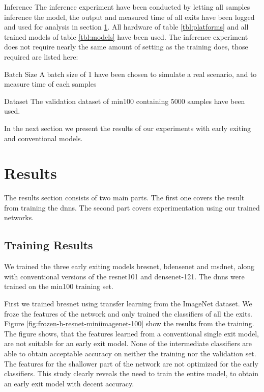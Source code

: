 \begin{enumdescript}
	\item[Inference] The inference experiment have been conducted by letting all samples inference the model, the output and measured time of all exits have been logged and used for analysis in section \ref{sec:ee-results}. All hardware of table \ref{tbl:platforms} and all trained models of table \ref{tbl:models} have been used. The inference experiment does not require nearly the same amount of setting as the training does, those required are listed here:
	\begin{enumdescript}
		\item[Batch Size] A batch size of 1 have been chosen to simulate a real scenario, and to measure time of each samples
		\item[Dataset] The validation dataset of \gls{min100} containing 5000 samples have been used.
	\end{enumdescript} 
	
\end{enumdescript}

In the next section we present the results of our experiments with early exiting and conventional models.

\section{Results} \label{sec:ee-results}

The results section consists of two main parts. The first one covers the result from training the \gls{dnn}s. The second part covers experimentation using our trained networks. 

\subsection{Training Results}

We trained the three early exiting models \gls{bresnet}, \gls{bdensenet} and \gls{msdnet}, along with conventional versions of the \gls{resnet}101 and \gls{densenet}-121. The \gls{dnn}s were trained on the \gls{min100} training set.

First we trained {bresnet} using transfer learning from the ImageNet dataset. We froze the features of the network and only trained the classifiers of all the exits. Figure \ref{fig:frozen-b-resnet-miniimagenet-100} show the results from the training. The figure shows, that the features learned from a conventional single exit model, are not suitable for an early exit model. None of the intermediate classifiers are able to obtain acceptable accuracy on neither the training nor the validation set. The features for the shallower part of the network are not optimized for the early classifiers. This study clearly reveals the need to train the entire model, to obtain an early exit model with decent accuracy.  

